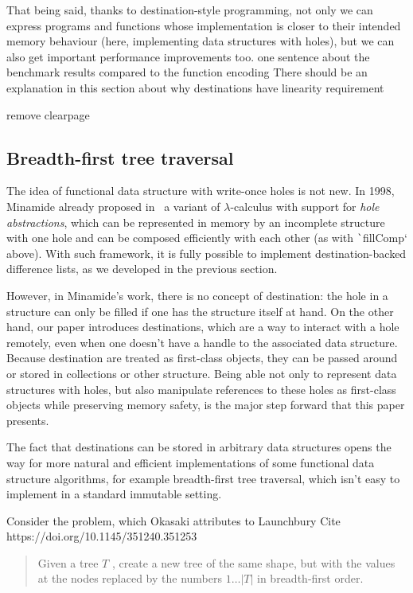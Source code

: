 \documentclass[english]{jflart}
\newcommand{\TODO}[1]{{\color{red}\large #1}}
\begin{document}
That being said, thanks to destination-style programming, not only we can express programs and functions whose implementation is closer to their intended memory behaviour (here, implementing data structures with holes), but we can also get important performance improvements too. \TODO{one sentence about the benchmark results compared to the function encoding}
\TODO{There should be an explanation in this section about why destinations have linearity requirement}

\TODO{remove clearpage}
\clearpage{}

\subsection{Breadth-first tree traversal}\label{ssec:bf-tree-traversal}

The idea of functional data structure with write-once holes is not new. In 1998, Minamide already proposed in~\cite{minamide_functional_1998} a variant of $\lambda$-calculus with support for \emph{hole abstractions}, which can be represented in memory by an incomplete structure with one hole and can be composed efficiently with each other (as with \texttt`fillComp` above). With such framework, it is fully possible to implement destination-backed difference lists, as we developed in the previous section.

However, in Minamide's work, there is no concept of destination: the hole in a structure can only be filled if one has the structure itself at hand. On the other hand, our paper introduces destinations, which are a way to interact with a hole remotely, even when one doesn't have a handle to the associated data structure. Because destination are treated as first-class objects, they can be passed around or stored in collections or other structure. Being able not only to represent data structures with holes, but also manipulate references to these holes as first-class objects while preserving memory safety, is the major step forward that this paper presents.

The fact that destinations can be stored in arbitrary data structures opens the way for more natural and efficient implementations of some functional data structure algorithms, for example breadth-first tree traversal, which isn't easy to implement in a standard immutable setting.

Consider the problem, which Okasaki attributes to Launchbury \TODO{Cite https://doi.org/10.1145/351240.351253}
\begin{quote}
  Given a tree $T$ , create a new tree of the same
  shape, but with the values at the nodes replaced
  by the numbers $1\ldots|T|$ in breadth-first order.
\end{quote}
\end{document}
